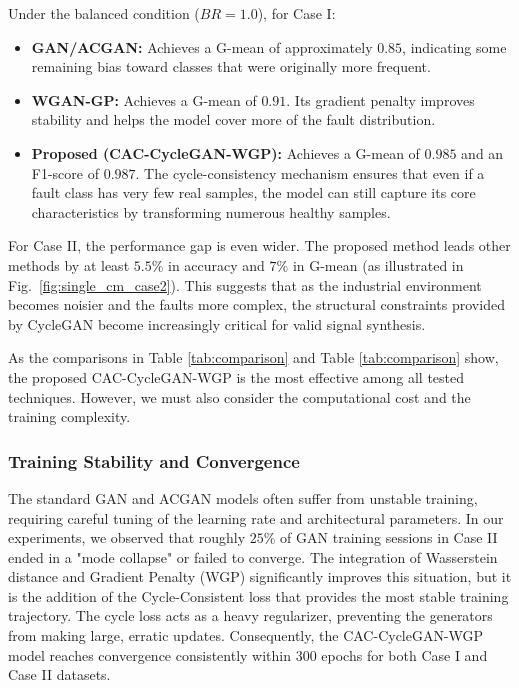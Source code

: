 Under the balanced condition ($BR=1.0$), for Case I:
\begin{itemize}
    \item \textbf{GAN/ACGAN:} Achieves a G-mean of approximately $0.85$, indicating some remaining bias toward classes that were originally more frequent.
    \item \textbf{WGAN-GP:} Achieves a G-mean of $0.91$. Its gradient penalty improves stability and helps the model cover more of the fault distribution.
    \item \textbf{Proposed (CAC-CycleGAN-WGP):} Achieves a G-mean of $0.985$ and an F1-score of $0.987$. The cycle-consistency mechanism ensures that even if a fault class has very few real samples, the model can still capture its core characteristics by transforming numerous healthy samples.
\end{itemize}

For Case II, the performance gap is even wider. The proposed method leads other methods by at least $5.5\%$ in accuracy and $7\%$ in G-mean (as illustrated in Fig.~\ref{fig:single_cm_case2}). This suggests that as the industrial environment becomes noisier and the faults more complex, the structural constraints provided by CycleGAN become increasingly critical for valid signal synthesis.

As the comparisons in Table \ref{tab:comparison} and Table \ref{tab:comparison} show, the proposed CAC-CycleGAN-WGP is the most effective among all tested techniques. However, we must also consider the computational cost and the training complexity.

\subsubsection{Training Stability and Convergence}
The standard GAN and ACGAN models often suffer from unstable training, requiring careful tuning of the learning rate and architectural parameters. In our experiments, we observed that roughly $25\%$ of GAN training sessions in Case II ended in a "mode collapse" or failed to converge. The integration of Wasserstein distance and Gradient Penalty (WGP) significantly improves this situation, but it is the addition of the Cycle-Consistent loss that provides the most stable training trajectory. The cycle loss acts as a heavy regularizer, preventing the generators from making large, erratic updates. Consequently, the CAC-CycleGAN-WGP model reaches convergence consistently within 300 epochs for both Case I and Case II datasets.

